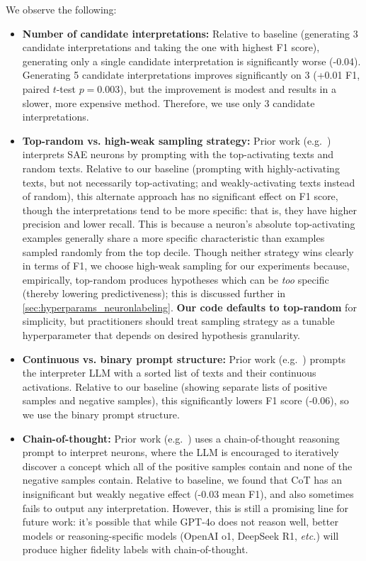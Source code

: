 We observe the following:
\begin{itemize}
    \item \textbf{Number of candidate interpretations:} Relative to baseline (generating 3 candidate interpretations and taking the one with highest F1 score), generating only a single candidate interpretation is significantly worse (-0.04). 
    Generating 5 candidate interpretations improves significantly on 3 (+0.01 F1, paired $t$-test $p = 0.003$), but the improvement is modest and results in a slower, more expensive method. 
    Therefore, we use only 3 candidate interpretations.
    
    \item \textbf{Top-random vs. high-weak sampling strategy:} Prior work (e.g.~\citet{templeton2024scaling, bills2023language}) interprets SAE neurons by prompting with the top-activating texts and random texts. 
    Relative to our baseline (prompting with highly-activating texts, but not necessarily top-activating; and weakly-activating texts instead of random), this alternate approach has no significant effect on F1 score, though the interpretations tend to be more specific: that is, they have higher precision and lower recall. 
    This is because a neuron's absolute top-activating examples generally share a more specific characteristic than examples sampled randomly from the top decile.
    Though neither strategy wins clearly in terms of F1, we choose high-weak sampling for our experiments because, empirically, top-random produces hypotheses which can be \textit{too} specific (thereby lowering predictiveness); this is discussed further in \ref{sec:hyperparams_neuronlabeling}.
    \textbf{Our code defaults to top-random} for simplicity, but practitioners should treat sampling strategy as a tunable hyperparameter that depends on desired hypothesis granularity.
    
    \item \textbf{Continuous vs. binary prompt structure:} Prior work (e.g.~\citet{zhong_explaining_2024}) prompts the interpreter LLM with a sorted list of texts and their continuous activations. Relative to our baseline (showing separate lists of positive samples and negative samples), this significantly lowers F1 score (-0.06), so we use the binary prompt structure.
    
    \item \textbf{Chain-of-thought:} Prior work (e.g.~\citet{oneill_disentangling_2024}) uses a chain-of-thought reasoning prompt to interpret neurons, where the LLM is encouraged to iteratively discover a concept which all of the positive samples contain and none of the negative samples contain. 
    Relative to baseline, we found that CoT has an insignificant but weakly negative effect (-0.03 mean F1), and also sometimes fails to output any interpretation. 
    However, this is still a promising line for future work: it's possible that while GPT-4o does not reason well, better models or reasoning-specific models (OpenAI o1, DeepSeek R1, \textit{etc.}) will produce higher fidelity labels with chain-of-thought.
    

\end{itemize}

